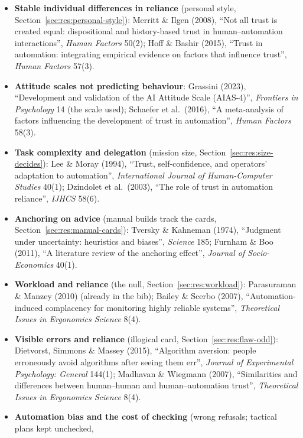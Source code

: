 \documentclass[10pt]{article}
\theoremstyle{definition}
\begin{document}
\begin{itemize}[itemsep=2pt]
  \item \textbf{Stable individual differences in reliance} (personal style, Section~\ref{sec:res:personal-style}):
    Merritt \& Ilgen (2008), ``Not all trust is created equal: dispositional and history-based trust in
    human--automation interactions'', \emph{Human Factors} 50(2); Hoff \& Bashir (2015), ``Trust in automation:
    integrating empirical evidence on factors that influence trust'', \emph{Human Factors} 57(3).
  \item \textbf{Attitude scales not predicting behaviour}: Grassini (2023), ``Development and validation of the AI
    Attitude Scale (AIAS-4)'', \emph{Frontiers in Psychology} 14 (the scale used); Schaefer et al.\ (2016), ``A
    meta-analysis of factors influencing the development of trust in automation'', \emph{Human Factors} 58(3).
  \item \textbf{Task complexity and delegation} (mission size, Section~\ref{sec:res:size-decides}): Lee \& Moray
    (1994), ``Trust, self-confidence, and operators' adaptation to automation'', \emph{International Journal of
    Human-Computer Studies} 40(1); Dzindolet et al.\ (2003), ``The role of trust in automation reliance'',
    \emph{IJHCS} 58(6).
  \item \textbf{Anchoring on advice} (manual builds track the cards, Section~\ref{sec:res:manual-cards}):
    Tversky \& Kahneman (1974), ``Judgment under uncertainty: heuristics and biases'', \emph{Science} 185;
    Furnham \& Boo (2011), ``A literature review of the anchoring effect'', \emph{Journal of Socio-Economics} 40(1).
  \item \textbf{Workload and reliance} (the null, Section~\ref{sec:res:workload}): Parasuraman \& Manzey (2010)
    (already in the bib); Bailey \& Scerbo (2007), ``Automation-induced complacency for monitoring highly reliable
    systems'', \emph{Theoretical Issues in Ergonomics Science} 8(4).
  \item \textbf{Visible errors and reliance} (illogical card, Section~\ref{sec:res:flaw-odd}): Dietvorst, Simmons
    \& Massey (2015), ``Algorithm aversion: people erroneously avoid algorithms after seeing them err'',
    \emph{Journal of Experimental Psychology: General} 144(1); Madhavan \& Wiegmann (2007), ``Similarities and
    differences between human--human and human--automation trust'', \emph{Theoretical Issues in Ergonomics
    Science} 8(4).
  \item \textbf{Automation bias and the cost of checking} (wrong refusals; tactical plans kept unchecked,

\end{itemize}
\end{document}
